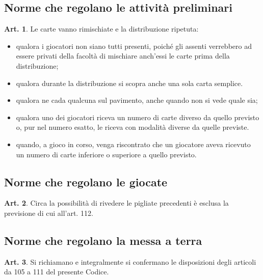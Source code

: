 \documentclass[italian,a4paper]{article}
\theoremstyle{definition}
\newtheorem{art}{Art.}
\begin{document}
\subsection{Norme che regolano le attività preliminari}
\begin{art}
Le carte vanno rimischiate e la distribuzione ripetuta:
\begin{itemize}
\item    qualora i giocatori non siano tutti presenti, poiché gli assenti verrebbero ad essere privati della facoltà di mischiare anch'essi le carte prima della distribuzione;
\item    qualora durante la distribuzione si scopra anche una sola carta semplice.
\item    qualora ne cada qualcuna sul pavimento, anche quando non si vede quale sia;
\item    qualora uno dei giocatori riceva un numero di carte diverso da quello previsto o, pur nel numero esatto, le riceva con modalità diverse da quelle previste.
\item      quando, a gioco in corso, venga riscontrato che un giocatore aveva ricevuto un numero di carte inferiore o superiore a quello previsto.
    \end{itemize}
\end{art}
\subsection{Norme che regolano le giocate}
\begin{art}
Circa la possibilità di rivedere le pigliate precedenti è esclusa la previsione di cui all'art. 112.
\end{art}
\subsection{Norme che regolano la messa a terra}
\begin{art}
Si richiamano e integralmente si confermano le disposizioni degli articoli da 105 a 111 del presente Codice.
\end{art}
\end{document}
